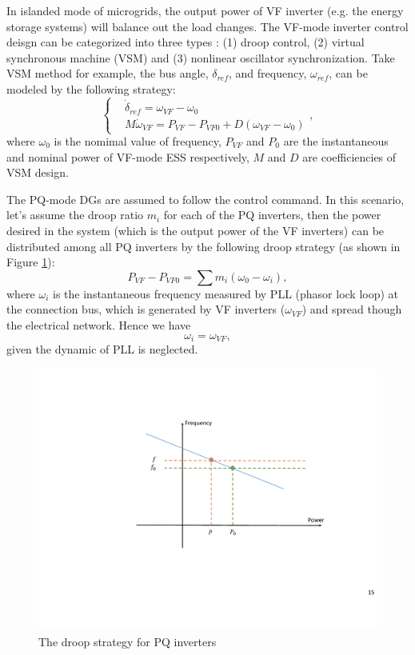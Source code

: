 \documentclass{article}
\begin{document}
In islanded mode of microgrids, the output power of VF inverter (e.g. the energy storage systems) will balance out the load changes. The VF-mode inverter control deisgn can be categorized into three types \cite{Kroposki2017achieve}: (1) droop control, (2) virtual synchronous machine (VSM) and (3) nonlinear oscillator synchronization. Take VSM method for example, the bus angle, $\delta_{ref}$, and frequency, $\omega_{ref}$, can be modeled by the following strategy:
\begin{equation}
\left\{\begin{split}
    &\dot \delta_{ref} = \omega_{VF} - \omega_0\\
     &M \dot \omega_{VF} =  P_{VF}- P_{VF0}+D(\omega_{VF} - \omega_0)
\end{split} \right., \label{eq:drpi}
\end{equation}
where $\omega_0$ is the nomimal value of frequency, $P_{VF}$ and $P_{0}$ are the instantaneous and nominal power of VF-mode ESS respectively, $M$ and $D$ are coefficiencies of VSM design.

The PQ-mode DGs are assumed to follow the control command. In this scenario, let's assume the droop ratio $m_i$ for each of the PQ inverters,
then the power desired in the system (which is the output power of the VF inverters) can be distributed among all PQ inverters by the following droop strategy (as shown in Figure \ref{fig:fdroop}):
\begin{equation}
    P_{VF}- P_{VF0} =  \sum m_i(\omega_0-\omega_i), \label{eq:drpi}
\end{equation}
where $\omega_i$ is the instantaneous frequency measured by PLL (phasor lock loop) at the connection bus, which is generated by VF inverters ($\omega_{VF}$) and spread though the electrical network. Hence we have
\begin{equation}
    \omega_i = \omega_{VF},
\end{equation}
given the dynamic of PLL is neglected.
\begin{figure}[ht]
    \centering
    \includegraphics[width=\linewidth]{pics/fdroop.pdf}
    \caption{The droop strategy for PQ inverters}
\label{fig:fdroop}
\end{figure}
\end{document}
